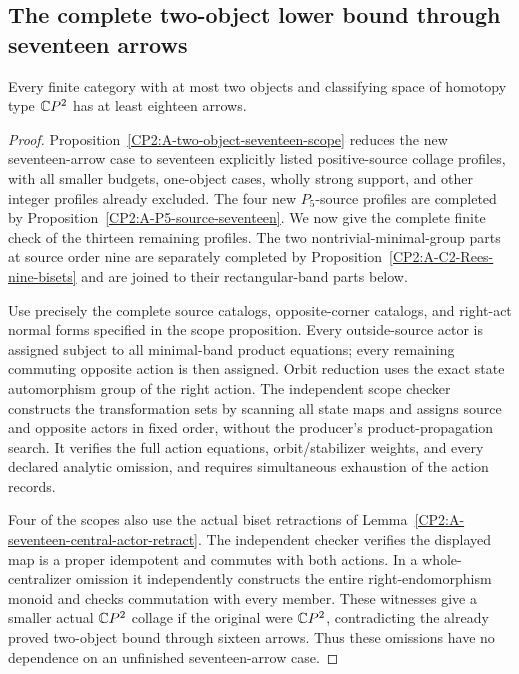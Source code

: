 \subsection{The complete two-object lower bound through seventeen arrows}

\begin{theorem}
\label{CP2:A-two-object-seventeen}
Every finite category with at most two objects and classifying
space of homotopy type $\mathbb{C}P^2$ has at least eighteen arrows.
\end{theorem}
\begin{proof}
Proposition~\ref{CP2:A-two-object-seventeen-scope} reduces the
new seventeen-arrow case to seventeen explicitly listed
positive-source collage profiles, with all smaller budgets,
one-object cases, wholly strong support, and other integer
profiles already excluded. The four new $P_5$-source profiles
are completed by Proposition~\ref{CP2:A-P5-source-seventeen}.
We now give the complete finite check of the thirteen
remaining profiles. The two nontrivial-minimal-group parts
at source order nine are separately completed by
Proposition~\ref{CP2:A-C2-Rees-nine-bisets} and are joined to
their rectangular-band parts below.

Use precisely the complete source catalogs, opposite-corner
catalogs, and right-act normal forms specified in the scope
proposition. Every outside-source actor is assigned subject
to all minimal-band product equations; every remaining
commuting opposite action is then assigned. Orbit reduction
uses the exact state automorphism group of the right action.
The independent scope checker constructs the transformation
sets by scanning all state maps and assigns source and
opposite actors in fixed order, without the producer's
product-propagation search. It verifies the full action
equations, orbit/stabilizer weights, and every declared
analytic omission, and requires simultaneous exhaustion of
the action records.

Four of the scopes also use the actual biset
retractions of Lemma~\ref{CP2:A-seventeen-central-actor-retract}.
The independent checker verifies the displayed map is a
proper idempotent and commutes with both actions. In a
whole-centralizer omission it independently constructs the
entire right-endomorphism monoid and checks commutation
with every member. These witnesses give a smaller actual
$\mathbb{C}P^2$ collage if the original were $\mathbb{C}P^2$, contradicting
the already proved two-object bound through sixteen arrows.
Thus these omissions have no dependence on an unfinished
seventeen-arrow case.


\end{proof}
